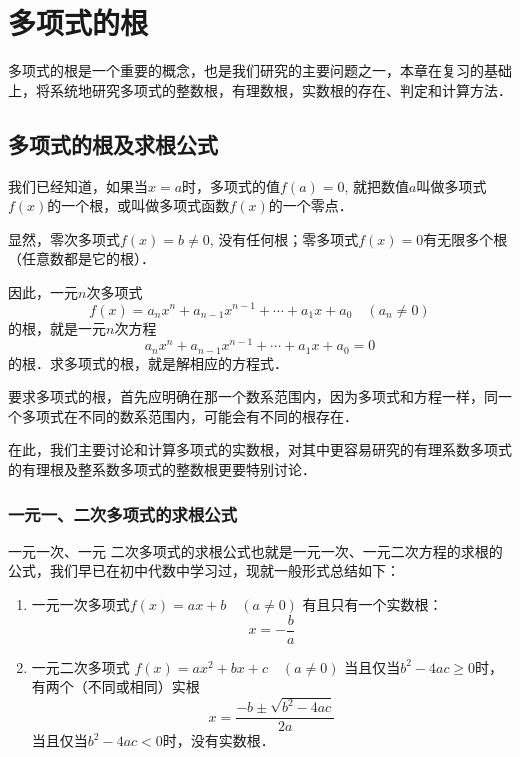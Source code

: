 \chapter{多项式的根}
多项式的根是一个重要的概念，也是我们研究的主要问题之一，本章在复习的基础上，将系统地研究多项式的整数根，有理数根，实数根的存在、判定和计算方法．

\section{多项式的根及求根公式}
我们已经知道，如果当$x=a$时，多项式的值$f(a)=0$, 就把数值$a$叫做多项式$f(x)$的一个根，或叫做多项式函数$f(x)$的一个零点．

显然，零次多项式$f(x)=b\ne 0$, 没有任何根；零多项式$f(x)=0$有无限多个根（任意数都是它的根）．

因此，一元$n$次多项式
\[f(x)=a_nx^n+a_{n-1}x^{n-1}+\cdots+a_1x+a_0\quad (a_n\ne 0)\]
的根，就是一元$n$次方程
\[a_nx^n+a_{n-1}x^{n-1}+\cdots+a_1x+a_0=0\]
的根．求多项式的根，就是解相应的方程式．

要求多项式的根，首先应明确在那一个数系范围内，因为多项式和方程一样，同一个多项式在不同的数系范围内，可能会有不同的根存在．

在此，我们主要讨论和计算多项式的实数根，对其中更容易研究的有理系数多项式的有理根及整系数多项式的整数根更要特别讨论．

\subsection{一元一、二次多项式的求根公式}

一元一次、一元
二次多项式的求根公式也就是一元一次、一元二次方程的求根的公式，我们早已在初中代数中学习过，现就一般形式总结如下：

\begin{enumerate}
    \item 一元一次多项式$  f (x) =ax+b\quad  (a\ne 0)$
    有且只有一个实数根：
    \begin{equation}
        x=-\frac{b}{a}
    \end{equation}
    \item 一元二次多项式
    $f (x) =ax^2+bx+c\quad  (a\ne0)$
    当且仅当$b^2-4ac\ge 0$时，有两个（不同或相同）实根
    \begin{equation}
        x=\frac{-b\pm\sqrt{b^2-4ac}}{2a}
    \end{equation}
    当且仅当$b^2-4ac<0$时，没有实数根．
\end{enumerate}

